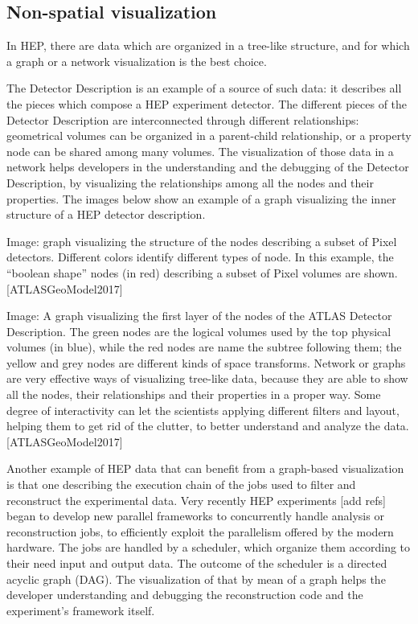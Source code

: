 \documentclass[12pt,a4paper]{article}
\begin{document}
\hypertarget{non-spatial-visualization}{%
\subsection{Non-spatial visualization}\label{non-spatial-visualization}}

In HEP, there are data which are organized in a tree-like structure, and for which a graph or a network visualization is the best choice.

The Detector Description is an example of a source of such data: it describes all the pieces which compose a HEP experiment detector.
The different pieces of the Detector Description are interconnected through different relationships: geometrical volumes can be organized
in a parent-child relationship, or a property node can be shared among many volumes. The visualization of those data in a network helps
developers in the understanding and the debugging of the Detector Description, by visualizing the relationships among all the nodes and
their properties. The images below show an example of a graph visualizing the inner structure of a HEP detector description.

Image: graph visualizing the structure of the nodes describing a subset of Pixel detectors. Different colors identify different types
of node. In this example, the “boolean shape” nodes (in red) describing a subset of Pixel volumes are shown. [ATLASGeoModel2017]

Image: A graph visualizing the first layer of the nodes of the ATLAS Detector Description. The green nodes are the logical volumes used
by the top physical volumes (in blue), while the red nodes are name the subtree following them; the yellow and grey nodes are different
kinds of space transforms. Network or graphs are very effective ways of visualizing tree-like data, because they are able to show all the
nodes, their relationships and their properties in a proper way. Some degree of interactivity can let the scientists applying different
filters and layout, helping them to get rid of the clutter, to better understand and analyze the data. [ATLASGeoModel2017]

Another example of HEP data that can benefit from a graph-based visualization is that one describing the execution chain of the jobs
used to filter and reconstruct the experimental data. Very recently HEP experiments [add refs] began to develop new parallel frameworks
to concurrently handle analysis or reconstruction jobs, to efficiently exploit the parallelism offered by the modern hardware.
The jobs are handled by a scheduler, which organize them according to their need input and output data. The outcome of the scheduler
is a directed acyclic graph (DAG). The visualization of that by mean of a graph helps the developer understanding and debugging the
reconstruction code and the experiment’s framework itself.
\end{document}
